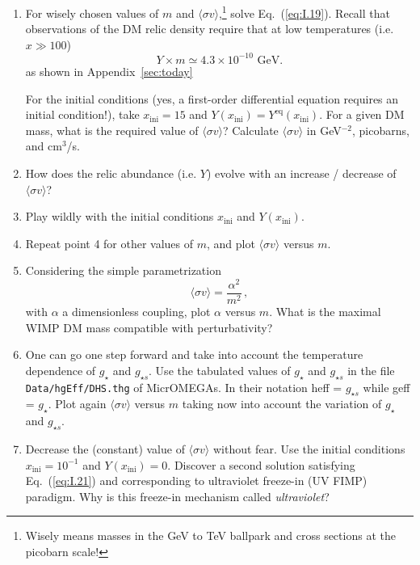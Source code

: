 \documentclass[11pt,a4paper]{article}
\begin{document}
\begin{enumerate}
    \item For wisely chosen values of $m$ and $\langle \sigma v \rangle$,\footnote{Wisely means masses in the GeV to TeV ballpark and cross sections at the picobarn scale!} solve Eq.~(\ref{eq:I.19}). Recall that observations of the DM relic density require that at low temperatures (i.e. $x \gg 100$)
    \begin{equation} \label{eq:I.21}
        Y \times m \simeq 4.3 \times 10^{-10} \text{ GeV}.
    \end{equation}
as shown in Appendix~\ref{sec:today}
    
    For the initial conditions (yes, a first-order differential equation requires an initial condition!), take $x_{\text{ini}} = 15$ and $Y(x_{\text{ini}}) = Y^{\text{eq}}(x_{\text{ini}})$. For a given DM mass, what is the required value of $\langle \sigma v \rangle$? Calculate $\langle \sigma v \rangle$ in GeV$^{-2}$, picobarns, and cm$^3$/s.
    
    \item How does the relic abundance (i.e. $Y$) evolve with an increase / decrease of $\langle \sigma v \rangle$?
    \item Play wildly with the initial conditions $x_{\text{ini}}$ and $Y(x_{\text{ini}})$.
    \item Repeat point 4 for other values of $m$, and plot $\langle \sigma v \rangle$ versus $m$.
    \item Considering the simple parametrization
    \begin{equation} \label{eq:I.22}
        \langle \sigma v \rangle = \frac{\alpha^2}{m^2} \, ,
    \end{equation}
    with $\alpha$ a dimensionless coupling, plot $\alpha$ versus $m$. What is the maximal WIMP DM mass compatible with perturbativity?
    
    \item One can go one step forward and take into account the temperature dependence of $g_\star$ and $g_{\star s}$. Use the tabulated values of $g_\star$ and $g_{\star s}$ in the file \texttt{Data/hgEff/DHS.thg} of MicrOMEGAs. In their notation heff = $g_{\star s}$ while geff = $g_\star$. Plot again $\langle \sigma v \rangle$ versus $m$ taking now into account the variation of $g_\star$ and $g_{\star s}$.
    
    \item Decrease the (constant) value of $\langle \sigma v \rangle$ without fear. Use the initial conditions $x_{\text{ini}} = 10^{-1}$ and $Y(x_{\text{ini}}) = 0$. Discover a second solution satisfying Eq.~(\ref{eq:I.21}) and corresponding to ultraviolet freeze-in (UV FIMP) paradigm. Why is this freeze-in mechanism called \textit{ultraviolet}?
    

\end{enumerate}
\end{document}
